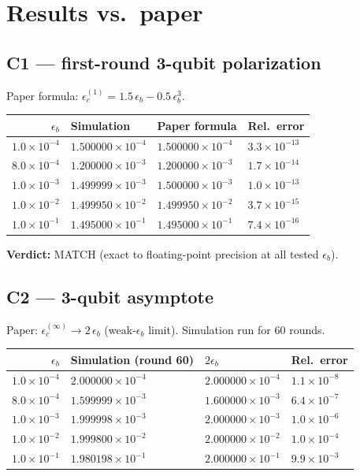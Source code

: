 \documentclass[11pt]{article}
\begin{document}
\section{Results vs.\ paper}

\subsection{C1 --- first-round 3-qubit polarization}

Paper formula: $\epsilon_c^{(1)} = 1.5\,\epsilon_b - 0.5\,\epsilon_b^{3}$.

\begin{tabular}{rlll}
\toprule
$\epsilon_b$ & Simulation & Paper formula & Rel.\ error \\
\midrule
$1.0\times 10^{-4}$ & $1.500000\times 10^{-4}$ & $1.500000\times 10^{-4}$ & $3.3\times 10^{-13}$ \\
$8.0\times 10^{-4}$ & $1.200000\times 10^{-3}$ & $1.200000\times 10^{-3}$ & $1.7\times 10^{-14}$ \\
$1.0\times 10^{-3}$ & $1.499999\times 10^{-3}$ & $1.500000\times 10^{-3}$ & $1.0\times 10^{-13}$ \\
$1.0\times 10^{-2}$ & $1.499950\times 10^{-2}$ & $1.499950\times 10^{-2}$ & $3.7\times 10^{-15}$ \\
$1.0\times 10^{-1}$ & $1.495000\times 10^{-1}$ & $1.495000\times 10^{-1}$ & $7.4\times 10^{-16}$ \\
\bottomrule
\end{tabular}

\textbf{Verdict:} MATCH (exact to floating-point precision at all tested
$\epsilon_b$).

\subsection{C2 --- 3-qubit asymptote}

Paper: $\epsilon_c^{(\infty)} \to 2\,\epsilon_b$ (weak-$\epsilon_b$ limit).
Simulation run for 60 rounds.

\begin{tabular}{rlll}
\toprule
$\epsilon_b$ & Simulation (round 60) & $2\epsilon_b$ & Rel.\ error \\
\midrule
$1.0\times 10^{-4}$ & $2.000000\times 10^{-4}$ & $2.000000\times 10^{-4}$ & $1.1\times 10^{-8}$ \\
$8.0\times 10^{-4}$ & $1.599999\times 10^{-3}$ & $1.600000\times 10^{-3}$ & $6.4\times 10^{-7}$ \\
$1.0\times 10^{-3}$ & $1.999998\times 10^{-3}$ & $2.000000\times 10^{-3}$ & $1.0\times 10^{-6}$ \\
$1.0\times 10^{-2}$ & $1.999800\times 10^{-2}$ & $2.000000\times 10^{-2}$ & $1.0\times 10^{-4}$ \\
$1.0\times 10^{-1}$ & $1.980198\times 10^{-1}$ & $2.000000\times 10^{-1}$ & $9.9\times 10^{-3}$ \\
\bottomrule
\end{tabular}
\end{document}
